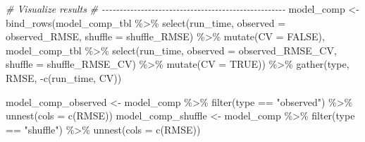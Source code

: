 \documentclass[12pt]{article}
\newenvironment{Shaded}{\begin{snugshade}}{\end{snugshade}}
\newcommand{\AttributeTok}[1]{\textcolor[rgb]{0.77,0.63,0.00}{#1}}
\newcommand{\CommentTok}[1]{\textcolor[rgb]{0.56,0.35,0.01}{\textit{#1}}}
\newcommand{\ConstantTok}[1]{\textcolor[rgb]{0.00,0.00,0.00}{#1}}
\newcommand{\FunctionTok}[1]{\textcolor[rgb]{0.00,0.00,0.00}{#1}}
\newcommand{\NormalTok}[1]{#1}
\newcommand{\OtherTok}[1]{\textcolor[rgb]{0.56,0.35,0.01}{#1}}
\newcommand{\SpecialCharTok}[1]{\textcolor[rgb]{0.00,0.00,0.00}{#1}}
\newcommand{\StringTok}[1]{\textcolor[rgb]{0.31,0.60,0.02}{#1}}
\begin{document}
\begin{Shaded}
\begin{Highlighting}[]
\CommentTok{\# Visualize results}
\CommentTok{\# {-}{-}{-}{-}{-}{-}{-}{-}{-}{-}{-}{-}{-}{-}{-}{-}{-}{-}{-}{-}{-}{-}{-}{-}{-}{-}{-}{-}{-}{-}{-}{-}{-}{-}{-}{-}{-}{-}{-}{-}{-}{-}{-}{-}{-}{-}{-}{-}{-}{-}{-}{-}}
\NormalTok{model\_comp }\OtherTok{\textless{}{-}} \FunctionTok{bind\_rows}\NormalTok{(model\_comp\_tbl }\SpecialCharTok{\%\textgreater{}\%}
    \FunctionTok{select}\NormalTok{(run\_time, }\AttributeTok{observed =}\NormalTok{ observed\_RMSE, }\AttributeTok{shuffle =}\NormalTok{ shuffle\_RMSE) }\SpecialCharTok{\%\textgreater{}\%}
    \FunctionTok{mutate}\NormalTok{(}\AttributeTok{CV =} \ConstantTok{FALSE}\NormalTok{), model\_comp\_tbl }\SpecialCharTok{\%\textgreater{}\%}
    \FunctionTok{select}\NormalTok{(run\_time, }\AttributeTok{observed =}\NormalTok{ observed\_RMSE\_CV, }\AttributeTok{shuffle =}\NormalTok{ shuffle\_RMSE\_CV) }\SpecialCharTok{\%\textgreater{}\%}
    \FunctionTok{mutate}\NormalTok{(}\AttributeTok{CV =} \ConstantTok{TRUE}\NormalTok{)) }\SpecialCharTok{\%\textgreater{}\%}
    \FunctionTok{gather}\NormalTok{(type, RMSE, }\SpecialCharTok{{-}}\FunctionTok{c}\NormalTok{(run\_time, CV))}

\NormalTok{model\_comp\_observed }\OtherTok{\textless{}{-}}\NormalTok{ model\_comp }\SpecialCharTok{\%\textgreater{}\%}
    \FunctionTok{filter}\NormalTok{(type }\SpecialCharTok{==} \StringTok{"observed"}\NormalTok{) }\SpecialCharTok{\%\textgreater{}\%}
    \FunctionTok{unnest}\NormalTok{(}\AttributeTok{cols =} \FunctionTok{c}\NormalTok{(RMSE))}
\NormalTok{model\_comp\_shuffle }\OtherTok{\textless{}{-}}\NormalTok{ model\_comp }\SpecialCharTok{\%\textgreater{}\%}
    \FunctionTok{filter}\NormalTok{(type }\SpecialCharTok{==} \StringTok{"shuffle"}\NormalTok{) }\SpecialCharTok{\%\textgreater{}\%}
    \FunctionTok{unnest}\NormalTok{(}\AttributeTok{cols =} \FunctionTok{c}\NormalTok{(RMSE))}


\end{Highlighting}
\end{Shaded}
\end{document}
